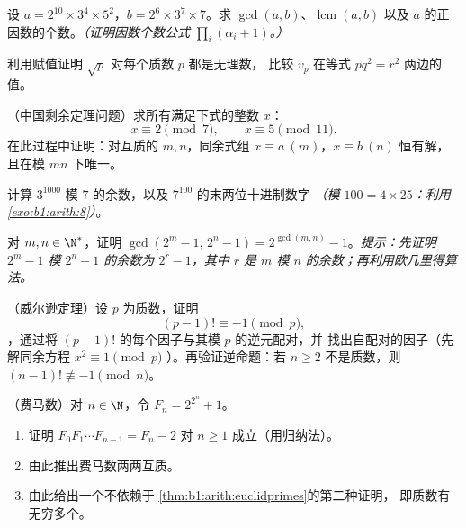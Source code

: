 \begin{exercise}[$\star\star$]\label{exo:b1:arith:6}
设 $a = 2^{10} \times 3^4 \times 5^2$，$b = 2^6 \times 3^7 \times
7$。求 $\gcd(a, b)$、$\operatorname{lcm}(a,b)$ 以及
$a$ 的正因数的个数。\emph{（证明因数个数公式
$\prod_i (\alpha_i + 1)$。）}
\end{exercise}

\begin{exercise}[$\star\star$]\label{exo:b1:arith:7}
利用赋值证明 $\sqrt p$ 对每个质数 $p$ 都是无理数，
比较 $v_p$ 在等式 $p q^2 = r^2$ 两边的值。
\end{exercise}

\begin{exercise}[$\star\star$]\label{exo:b1:arith:8}
（中国剩余定理问题）求所有满足下式的整数 $x$：
\[
x \equiv 2 \pmod 7, \qquad x \equiv 5 \pmod{11}.
\]
在此过程中证明：对互质的 $m, n$，同余式组
$x \equiv a \ (m)$，$x \equiv b\ (n)$ 恒有解，
且在模 $mn$ 下唯一。
\end{exercise}

\begin{exercise}[$\star\star$]\label{exo:b1:arith:9}
计算 $3^{1000}$ 模 $7$ 的余数，以及
$7^{100}$ 的末两位十进制数字 \emph{（模 $100 = 4 \times 25$：利用
\cref{exo:b1:arith:8}）}。
\end{exercise}

\begin{exercise}[$\star\star\star$]\label{exo:b1:arith:10}
对 $m, n \in \N^*$，证明 $\gcd(2^m - 1,\, 2^n - 1) =
2^{\gcd(m,n)} - 1$。\emph{提示：先证明 $2^m
- 1$ 模 $2^n - 1$ 的余数为 $2^r - 1$，其中 $r$ 是 $m$
模 $n$ 的余数；再利用欧几里得算法。}
\end{exercise}

\begin{exercise}[$\star\star\star$]\label{exo:b1:arith:11}
（威尔逊定理）设 $p$ 为质数，证明
\[
(p-1)! \equiv -1 \pmod p ,
\]
，通过将 $(p-1)!$ 的每个因子与其模 $p$ 的逆元配对，并
找出自配对的因子（先解同余方程 $x^2 \equiv 1 \pmod p$
）。再验证逆命题：若 $n \geq 2$ 不是质数，则 $(n-1)!
\not\equiv -1 \pmod n$。
\end{exercise}

\begin{exercise}[$\star\star\star$]\label{exo:b1:arith:12}
（费马数）对 $n \in \N$，令 $F_n = 2^{2^n} + 1$。
\begin{enumerate}
  \item 证明 $F_0 F_1 \cdots F_{n-1} = F_n - 2$ 对 $n \geq
        1$ 成立（用归纳法）。
  \item 由此推出费马数两两互质。
  \item 由此给出一个不依赖于
        \cref{thm:b1:arith:euclidprimes}的第二种证明，
        即质数有无穷多个。
\end{enumerate}
\end{exercise}

